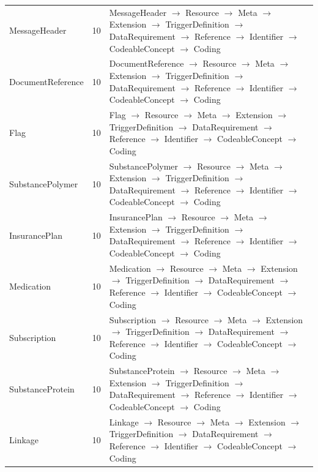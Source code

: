 \begin{longtable}{lrl}
MessageHeader & 10 & MessageHeader $\rightarrow$ Resource $\rightarrow$ Meta $\rightarrow$ Extension $\rightarrow$ TriggerDefinition $\rightarrow$ DataRequirement $\rightarrow$ Reference $\rightarrow$ Identifier $\rightarrow$ CodeableConcept $\rightarrow$ Coding \\
DocumentReference & 10 & DocumentReference $\rightarrow$ Resource $\rightarrow$ Meta $\rightarrow$ Extension $\rightarrow$ TriggerDefinition $\rightarrow$ DataRequirement $\rightarrow$ Reference $\rightarrow$ Identifier $\rightarrow$ CodeableConcept $\rightarrow$ Coding \\
Flag & 10 & Flag $\rightarrow$ Resource $\rightarrow$ Meta $\rightarrow$ Extension $\rightarrow$ TriggerDefinition $\rightarrow$ DataRequirement $\rightarrow$ Reference $\rightarrow$ Identifier $\rightarrow$ CodeableConcept $\rightarrow$ Coding \\
SubstancePolymer & 10 & SubstancePolymer $\rightarrow$ Resource $\rightarrow$ Meta $\rightarrow$ Extension $\rightarrow$ TriggerDefinition $\rightarrow$ DataRequirement $\rightarrow$ Reference $\rightarrow$ Identifier $\rightarrow$ CodeableConcept $\rightarrow$ Coding \\
InsurancePlan & 10 & InsurancePlan $\rightarrow$ Resource $\rightarrow$ Meta $\rightarrow$ Extension $\rightarrow$ TriggerDefinition $\rightarrow$ DataRequirement $\rightarrow$ Reference $\rightarrow$ Identifier $\rightarrow$ CodeableConcept $\rightarrow$ Coding \\
Medication & 10 & Medication $\rightarrow$ Resource $\rightarrow$ Meta $\rightarrow$ Extension $\rightarrow$ TriggerDefinition $\rightarrow$ DataRequirement $\rightarrow$ Reference $\rightarrow$ Identifier $\rightarrow$ CodeableConcept $\rightarrow$ Coding \\
Subscription & 10 & Subscription $\rightarrow$ Resource $\rightarrow$ Meta $\rightarrow$ Extension $\rightarrow$ TriggerDefinition $\rightarrow$ DataRequirement $\rightarrow$ Reference $\rightarrow$ Identifier $\rightarrow$ CodeableConcept $\rightarrow$ Coding \\
SubstanceProtein & 10 & SubstanceProtein $\rightarrow$ Resource $\rightarrow$ Meta $\rightarrow$ Extension $\rightarrow$ TriggerDefinition $\rightarrow$ DataRequirement $\rightarrow$ Reference $\rightarrow$ Identifier $\rightarrow$ CodeableConcept $\rightarrow$ Coding \\
Linkage & 10 & Linkage $\rightarrow$ Resource $\rightarrow$ Meta $\rightarrow$ Extension $\rightarrow$ TriggerDefinition $\rightarrow$ DataRequirement $\rightarrow$ Reference $\rightarrow$ Identifier $\rightarrow$ CodeableConcept $\rightarrow$ Coding \\

\end{longtable}
